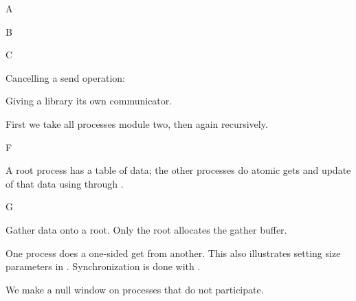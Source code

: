 
 {A}

 {B}

 {C}


Cancelling a send operation:





Giving a library its own communicator.



First we take all processes module two, then
again recursively.


 {F}


A root process has a table of data; the other processes do 
atomic gets and update of that data using  through .
%
%

 {G}


Gather data onto a root. Only the root allocates the gather buffer.


One process does a one-sided get from another. This also illustrates
setting size parameters in
. Synchronization is done with
.
%

We make a null window on processes that do not participate.
%

